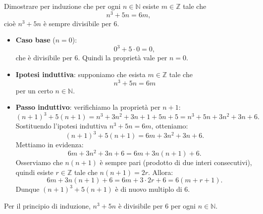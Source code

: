 \begin{esempio}
    Dimostrare per induzione che per ogni \(n \in \mathbb{N}\) esiste \(m \in \mathbb{Z}\) tale che
\[
n^3 + 5n = 6m,
\]
cioè \(n^3+5n\) è sempre divisibile per \(6\).
\begin{itemize}
    \item \textbf{Caso base} (\(n=0\)):
    \[
    0^3 + 5\cdot 0 = 0,
    \]
    che è divisibile per \(6\). Quindi la proprietà vale per \(n=0\).

    \item \textbf{Ipotesi induttiva}:
    supponiamo che esista \(m \in \mathbb{Z}\) tale che
    \[
    n^3 + 5n = 6m
    \]
    per un certo \(n \in \mathbb{N}\).

    \item \textbf{Passo induttivo}:
    verifichiamo la proprietà per \(n+1\):
    \[
    (n+1)^3 + 5(n+1)
    = n^3 + 3n^2 + 3n + 1 + 5n + 5
    = n^3 + 5n + 3n^2 + 3n + 6.
    \]
    Sostituendo l’ipotesi induttiva \(n^3 + 5n = 6m\), otteniamo:
    \[
    (n+1)^3 + 5(n+1) = 6m + 3n^2 + 3n + 6.
    \]
    Mettiamo in evidenza:
    \[
    6m + 3n^2 + 3n + 6
    = 6m + 3n(n+1) + 6.
    \]
    Osserviamo che \(n(n+1)\) è sempre pari (prodotto di due interi consecutivi),
    quindi esiste \(r \in \mathbb{Z}\) tale che \(n(n+1) = 2r\). Allora:
    \[
    6m + 3n(n+1) + 6
    = 6m + 3\cdot 2r + 6
    = 6(m + r + 1).
    \]
    Dunque \((n+1)^3 + 5(n+1)\) è di nuovo multiplo di \(6\).
\end{itemize}

Per il principio di induzione, \(n^3 + 5n\) è divisibile per \(6\) per ogni \(n \in \mathbb{N}\).
\end{esempio}

